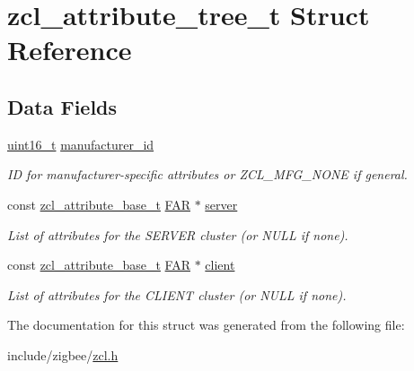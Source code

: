 \hypertarget{structzcl__attribute__tree__t}{}\section{zcl\+\_\+attribute\+\_\+tree\+\_\+t Struct Reference}
\label{structzcl__attribute__tree__t}
\subsection*{Data Fields}
\begin{DoxyCompactItemize}
\item 
\hyperlink{group__hal__dos_ga5a8b2dc9e45a9ee81a94ef304fb62505}{uint16\+\_\+t} \hyperlink{group__zcl_ga4ad31fcb69f8aaca8f3c1820bb4d8594}{manufacturer\+\_\+id}
\begin{DoxyCompactList}\small\item\em ID for manufacturer-\/specific attributes or Z\+C\+L\+\_\+\+M\+F\+G\+\_\+\+N\+O\+NE if general. \end{DoxyCompactList}\item 
const \hyperlink{structzcl__attribute__base__t}{zcl\+\_\+attribute\+\_\+base\+\_\+t} \hyperlink{group__hal_gaef060b3456fdcc093a7210a762d5f2ed}{F\+AR} $\ast$ \hyperlink{group__zcl_ga711c76cba8f7c0f30a95dcc5f7c0b7fb}{server}
\begin{DoxyCompactList}\small\item\em List of attributes for the S\+E\+R\+V\+ER cluster (or N\+U\+LL if none). \end{DoxyCompactList}\item 
const \hyperlink{structzcl__attribute__base__t}{zcl\+\_\+attribute\+\_\+base\+\_\+t} \hyperlink{group__hal_gaef060b3456fdcc093a7210a762d5f2ed}{F\+AR} $\ast$ \hyperlink{group__zcl_gabb37e65dc5e6f9179ff1c17268031d9b}{client}
\begin{DoxyCompactList}\small\item\em List of attributes for the C\+L\+I\+E\+NT cluster (or N\+U\+LL if none). \end{DoxyCompactList}\end{DoxyCompactItemize}


The documentation for this struct was generated from the following file\+:\begin{DoxyCompactItemize}
\item 
include/zigbee/\hyperlink{zcl_8h}{zcl.\+h}\end{DoxyCompactItemize}
